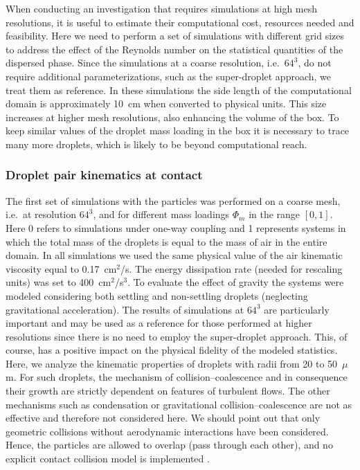 \documentclass[../thesis.tex]{subfiles}
\begin{document}
When conducting an investigation that requires simulations at high mesh resolutions, it is useful to estimate their computational cost, resources needed and feasibility. Here we need to perform a set of simulations with different grid sizes to address the effect of the Reynolds number on the statistical quantities of the dispersed phase. Since the simulations at a coarse resolution, i.e.\ $64^3$, do not require additional parameterizations, such as the super-droplet approach, we treat them as reference. In these simulations the side length of the computational domain is approximately 10~cm when converted to physical units. This size increases at higher mesh resolutions, also enhancing the volume of the box. To keep similar values of the droplet mass loading in the box it is necessary to trace many more droplets, which is likely to be beyond computational reach.

\subsubsection{Droplet pair kinematics at contact}

The first set of simulations with the particles was performed on a coarse mesh, i.e.\ at resolution $64^3$, and for different mass loadings $\Phi_m$ in the range $[0, 1]$. Here 0 refers to simulations under one-way coupling and 1 represents systems in which the total mass of the droplets is equal to the mass of air in the entire domain. In all simulations we used the same physical value of the air kinematic viscosity equal to 0.17~cm$^2$/s. The energy dissipation rate (needed for rescaling units) was set to 400~cm$^2$/s$^3$. To evaluate the effect of gravity the systems were modeled considering both settling and non-settling droplets (neglecting gravitational acceleration). The results of simulations at $64^3$ are particularly important and may be used as a reference for those performed at higher resolutions since there is no need to employ the super-droplet approach. This, of course, has a positive impact on the physical fidelity of the modeled statistics. Here, we analyze the kinematic properties of droplets with radii from 20 to 50~$\mu$m. For such droplets, the mechanism of collision--coalescence and in consequence their growth are strictly dependent on features of turbulent flows. The other mechanisms such as condensation or gravitational collision--coalescence are not as effective and therefore not considered here. We should point out that only geometric collisions without aerodynamic interactions have been considered. Hence, the particles are allowed to overlap (pass through each other), and no explicit contact collision model is implemented \citep[unlike][which relocate one particle after collisions]{ARPW21}.
\end{document}
